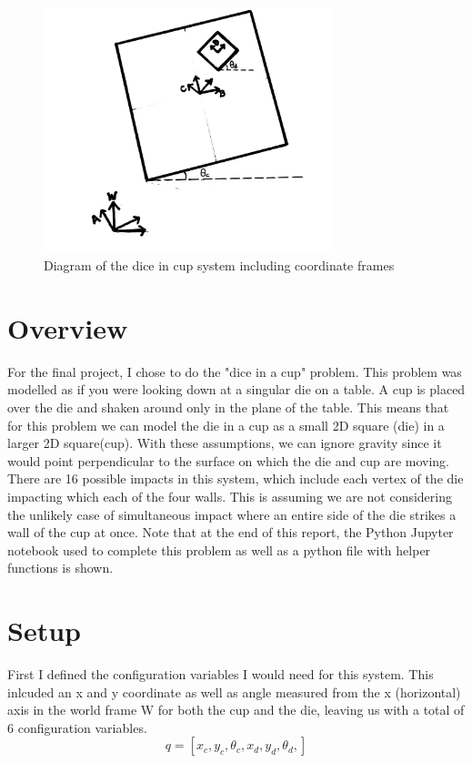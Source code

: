 \begin{figure}
    \centering
    \includegraphics[width=0.75\textwidth]{figs/Diagram.jpg}
    \caption{Diagram of the dice in cup system including coordinate frames}
    \label{diagram}
\end{figure}

\section{Overview}
For the final project, I chose to do the "dice in a cup" problem. This problem was modelled as if you were looking down at a singular die
on a table. A cup is placed over the die and shaken around only in the plane of the table. This means that for this problem we can model the  
die in a cup as a small 2D square (die) in a larger 2D square(cup). With these assumptions, we can ignore gravity since it would point perpendicular
to the surface on which the die and cup are moving. There are 16 possible impacts in this system, which include each vertex of the die 
impacting which each of the four walls. This is assuming we are not considering the unlikely case 
of simultaneous impact where an entire side of the die strikes a wall of the cup at once. Note that at the end of this report, the Python Jupyter notebook 
used to complete this problem as well as a python file with helper functions is shown.

\section{Setup}
First I defined the configuration variables I would need for this system. This inlcuded an x and y coordinate as well as angle measured from the x (horizontal) axis 
in the world frame {W} for both the cup and the die, leaving us with a total of 6 configuration variables.
\begin{equation*}
    q = [x_c, y_c, \theta_c, x_d, y_d, \theta_d,]
\end{equation*}

